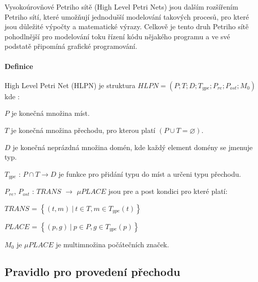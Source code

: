 Vysokoúrovňové Petriho sítě (High Level Petri Nets) jsou dalším rozšířením Petriho sítí, které umožňují jednodušší modelování takových procesů, pro které jsou důležité výpočty a matematické výrazy. Celkově je tento druh Petriho sítě pohodlnější pro modelování toku řízení kódu nějakého programu a ve své podstatě připomíná grafické programování.

\paragraph{Definice}

High Level Petri Net (HLPN) je struktura $HLPN = \left( P; T; D; T_{ype}; P_{re}; P_{ost}; M_0\right) $ kde \cite[p.11--12]{pnstd54}:

\begin{itemize}
  \item $P$ je konečná množina míst. \\
  \item $T$ je konečná množina přechodu, pro kterou platí $\left(P \cup T = \varnothing\right)$. \\
  \item $D$ je konečná neprázdná množina domén, kde každý element domény se jmenuje typ. \\
  \item $T_{ype}$ : $P \cap T \rightarrow D$ je funkce pro přidání typu do míst a určeni typu přechodu.
  \item $P_{re}$, $P_{ost}$ : $TRANS$ $\rightarrow$ $\mu PLACE$ jsou pre a post kondici pro které platí: \\
  \begin{center}
    \item $TRANS$ = $\left\{\left(t, m\right)\:\vert\:t \in T, m \in T_{ype} \left( t \right)\right\}$ \\
    \item $PLACE$ = $\left\{\left(p, g\right)\:\vert\:p \in P, g \in T_{ype} \left( p \right)\right\}$ \\
  \end{center}
  \item $M_0$ je $\mu PLACE$ je multimnožina počátečních značek.
\end{itemize}

\subsection{Pravidlo pro provedení přechodu}
\label{subsec:graph-transition}

